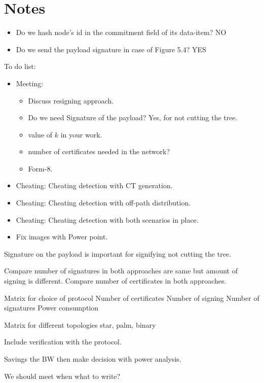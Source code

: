\chapter{Notes}

\begin{itemize}
	\item Do we hash node's id in the commitment field of its data-item? NO
	\item Do we send the payload signature in case of Figure 5.4? YES
\end{itemize}

To do list:
\begin{itemize}
	\item Meeting: 
	\begin{itemize}
	\item Discuss resigning approach.
	\item Do we need Signature of the payload? Yes, for not cutting the tree.
	\item value of $k$ in your work.
	\item number of certificates needed in the network?
	\item Form-8.	 
	\end{itemize}
	\item Cheating: Cheating detection with CT generation.
	\item Cheating: Cheating detection with off-path distribution.
	\item Cheating: Cheating detection with both scenarios in place.
	\item Fix images with Power point.
\end{itemize}

	Signature on the payload is important for signifying not cutting the tree.

	Compare number of signatures in both approaches are same but amount of signing is different.
	Compare number of certificates in both approaches.

	Matrix for choice of protocol
		Number of certificates
		Number of signing
		Number of signatures
		Power consumption

	Matrix for different topologies
		star, palm, binary 
		
	Include verification with the protocol.

	Savings the BW then make decision with power analysis.

We should meet when what to write?